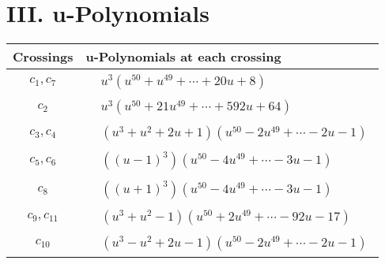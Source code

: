 \documentclass[1p]{elsarticle_modified}
\theoremstyle{definition}
\begin{document}
\newpage\renewcommand{\arraystretch}{1}
\centering \section*{ III. u-Polynomials}
\begin{tabular}{m{50pt}|m{274pt}}
Crossings & \hspace{64pt}u-Polynomials at each crossing \\
\hline $$\begin{aligned}c_{1},c_{7}\end{aligned}$$&$\begin{aligned}
&u^3(u^{50}+u^{49}+\cdots+20 u+8)
\end{aligned}$\\
\hline $$\begin{aligned}c_{2}\end{aligned}$$&$\begin{aligned}
&u^3(u^{50}+21 u^{49}+\cdots+592 u+64)
\end{aligned}$\\
\hline $$\begin{aligned}c_{3},c_{4}\end{aligned}$$&$\begin{aligned}
&(u^3+u^2+2 u+1)(u^{50}-2 u^{49}+\cdots-2 u-1)
\end{aligned}$\\
\hline $$\begin{aligned}c_{5},c_{6}\end{aligned}$$&$\begin{aligned}
&((u-1)^3)(u^{50}-4 u^{49}+\cdots-3 u-1)
\end{aligned}$\\
\hline $$\begin{aligned}c_{8}\end{aligned}$$&$\begin{aligned}
&((u+1)^3)(u^{50}-4 u^{49}+\cdots-3 u-1)
\end{aligned}$\\
\hline $$\begin{aligned}c_{9},c_{11}\end{aligned}$$&$\begin{aligned}
&(u^3+u^2-1)(u^{50}+2 u^{49}+\cdots-92 u-17)
\end{aligned}$\\
\hline $$\begin{aligned}c_{10}\end{aligned}$$&$\begin{aligned}
&(u^3- u^2+2 u-1)(u^{50}-2 u^{49}+\cdots-2 u-1)
\end{aligned}$\\
\hline
\end{tabular}\newpage\renewcommand{\arraystretch}{1}
\end{document}

